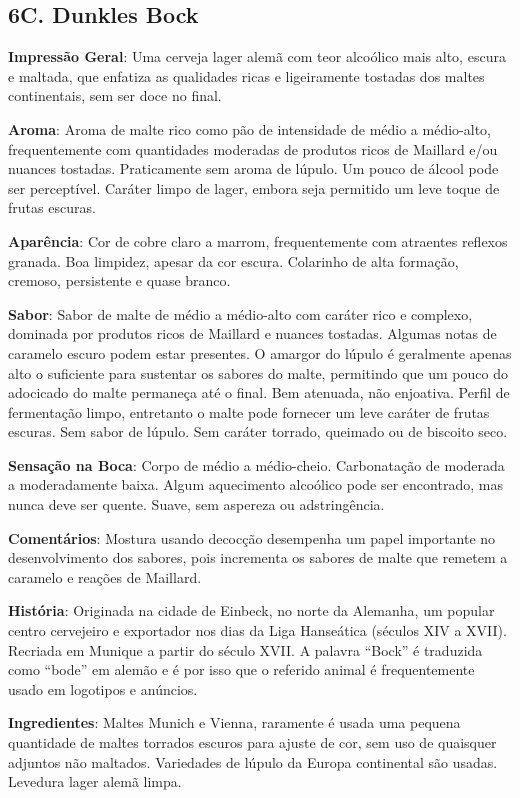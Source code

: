 \subsection*{6C. Dunkles Bock}
\textbf{Impressão Geral}: Uma cerveja lager alemã com teor alcoólico mais alto, escura e maltada, que enfatiza as qualidades ricas e ligeiramente tostadas dos maltes continentais, sem ser doce no final.

\textbf{Aroma}: Aroma de malte rico como pão de intensidade de médio a médio-alto, frequentemente com quantidades moderadas de produtos ricos de Maillard e/ou nuances tostadas. Praticamente sem aroma de lúpulo. Um pouco de álcool pode ser perceptível. Caráter limpo de lager, embora seja permitido um leve toque de frutas escuras.

\textbf{Aparência}: Cor de cobre claro a marrom, frequentemente com atraentes reflexos granada. Boa limpidez, apesar da cor escura. Colarinho de alta formação, cremoso, persistente e quase branco.

\textbf{Sabor}: Sabor de malte de médio a médio-alto com caráter rico e complexo, dominada por produtos ricos de Maillard e nuances tostadas. Algumas notas de caramelo escuro podem estar presentes. O amargor do lúpulo é geralmente apenas alto o suficiente para sustentar os sabores do malte, permitindo que um pouco do adocicado do malte permaneça até o final. Bem atenuada, não enjoativa. Perfil de fermentação limpo, entretanto o malte pode fornecer um leve caráter de frutas escuras. Sem sabor de lúpulo. Sem caráter torrado, queimado ou de biscoito seco.

\textbf{Sensação na Boca}: Corpo de médio a médio-cheio. Carbonatação de moderada a moderadamente baixa. Algum aquecimento alcoólico pode ser encontrado, mas nunca deve ser quente. Suave, sem aspereza ou adstringência.

\textbf{Comentários}: Mostura usando decocção desempenha um papel importante no desenvolvimento dos sabores, pois incrementa os sabores de malte que remetem a caramelo e reações de Maillard.

\textbf{História}: Originada na cidade de Einbeck, no norte da Alemanha, um popular centro cervejeiro e exportador nos dias da Liga Hanseática (séculos XIV a XVII). Recriada em Munique a partir do século XVII. A palavra “Bock” é traduzida como “bode” em alemão e é por isso que o referido animal é frequentemente usado em logotipos e anúncios.

\textbf{Ingredientes}: Maltes Munich e Vienna, raramente é usada uma pequena quantidade de maltes torrados escuros para ajuste de cor, sem uso de quaisquer adjuntos não maltados. Variedades de lúpulo da Europa continental são usadas. Levedura lager alemã limpa.


